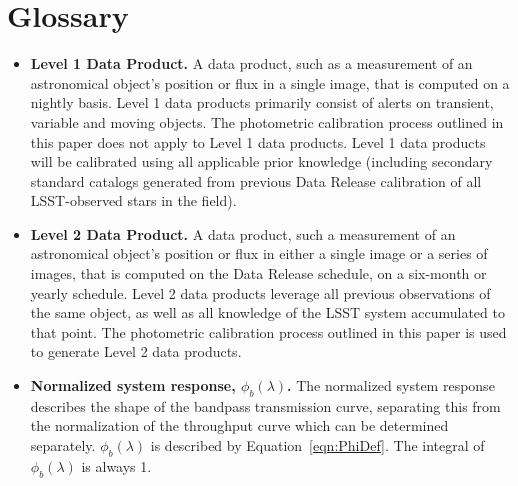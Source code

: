 \documentclass[12pt,preprint]{aastex}
\begin{document}



\section{Glossary}
\label{sec:glossary}

\begin{itemize}

\item{{\bf Level 1 Data Product.} A data product, such as a measurement
  of an astronomical object's position or flux in a single image, that
is computed on a nightly basis. Level 1 data products primarily
consist of alerts on transient, variable and moving objects. The
photometric calibration process outlined in this paper does not apply
to Level 1 data products. Level 1 data products will be calibrated
using all applicable prior knowledge (including secondary standard
catalogs generated from previous Data Release calibration of all
LSST-observed stars in the field). }

\item{{\bf Level 2 Data Product.} A data product, such a measurement
    of an astronomical object's position or flux in either a single
    image or a series of images, that is computed on the Data Release
    schedule, on a six-month or yearly schedule. Level 2 data products
    leverage all previous observations of the same object, as well as
    all knowledge of the LSST system accumulated to that point. The
    photometric calibration process outlined in this paper is used to
    generate Level 2 data products. }

\item{{\bf Normalized system response, $\phi_b(\lambda)$.} The
    normalized system response describes the shape of the bandpass
    transmission curve, separating this from the normalization of the
    throughput curve which can be determined separately.
    $\phi_b(\lambda)$ is described by Equation~\ref{eqn:PhiDef}. The
    integral of $\phi_b(\lambda)$ is always 1. }


\end{itemize}
\end{document}
